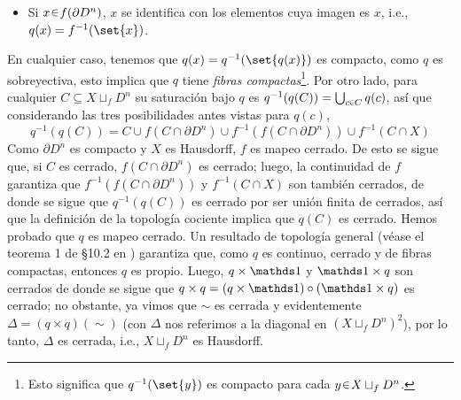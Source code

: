 \begin{sol}[Demostración]
\begin{itemize}
    \item Si $x \en f(\partial D^n)$, $x$ se identifica con los elementos cuya imagen es $x$, i.e., $q(x) = f^{-1}(\set{x})$.
\end{itemize}
En cualquier caso, tenemos que $q(x) = q^{-1}(\set{q(x)})$ es compacto, como $q$ es sobreyectiva, esto implica que $q$ tiene \emph{fibras compactas}\footnote{Esto significa que $q^{-1}(\set{y})$ es compacto para cada $y \en X \sqcup_f D^n$.}. Por otro lado, para cualquier $C \subseteq X \sqcup_f D^n$ su saturación bajo $q$ es $q^{-1}(q(C)) = \bigcup_{c \en C} q(c)$, así que considerando las tres posibilidades antes vistas para $q(c)$,
\[
q^{-1}(q(C)) = C \cup f(C \cap \partial D^n) \cup f^{-1}(f(C \cap \partial D^n)) \cup f^{-1}(C \cap X)
\]
Como $\partial D^n$ es compacto y $X$ es Hausdorff, $f$ es mapeo cerrado. De esto se sigue que, si $C$ es cerrado, $f(C \cap \partial D^n)$ es cerrado; luego, la continuidad de $f$ garantiza que $f^{-1}(f(C \cap \partial D^n))$ y $f^{-1}(C \cap X)$ son también cerrados, de donde se sigue que $q^{-1}(q(C))$ es cerrado por ser unión finita de cerrados, así que la definición de la topología cociente implica que $q(C)$ es cerrado. Hemos probado que $q$ es mapeo cerrado. Un resultado de topología general (véase el teorema 1 de \S10.2 en \cite{Bourbaki_Top}) garantiza que, como $q$ es continuo, cerrado y de fibras compactas, entonces $q$ es propio. Luego, $q \times {\id}$ y ${\id} \times q$ son cerrados de donde se sigue que $q \times q = (q \times {\id}) \circ ({\id} \times q)$ es cerrado; no obstante, ya vimos que $\sim$ es cerrada y  evidentemente $\Delta = (q \times q)(\sim)$ (con $\Delta$ nos referimos a la diagonal en $(X \sqcup_f D^n)^2$), por lo tanto, $\Delta$ es cerrada, i.e., $X \sqcup_f D^n$ es Hausdorff.
\end{sol}


